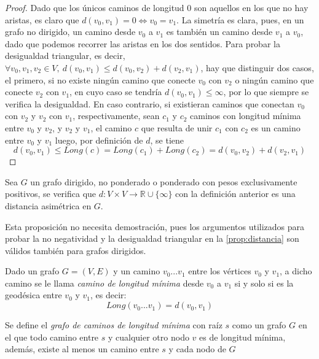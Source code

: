 \begin{proof}
	Dado que los únicos caminos de longitud $0$ son aquellos en los que no hay aristas, es claro que $d(v_0, v_1) = 0 \Leftrightarrow v_0 = v_1$. La simetría es clara, pues, en un grafo no dirigido, un camino desde $v_0$ a $v_1$ es también un camino desde $v_1$ a $v_0$, dado que podemos recorrer las aristas en los dos sentidos. Para probar la desigualdad triangular, es decir, $\forall v_0, v_1, v_2 \in V,\ d(v_0,v_1) \leq d(v_0,v_2) + d(v_2,v_1)$, hay que distinguir dos casos, el primero, si no existe ningún camino que conecte $v_0$ con $v_2$ o ningún camino que conecte $v_2$ con $v_1$, en cuyo caso se tendría $d(v_0,v_1)\leq \infty$, por lo que siempre se verifica la desigualdad. En caso contrario, si existieran caminos que conectan $v_0$ con $v_2$ y $v_2$ con $v_1$, respectivamente, sean $c_1$ y $c_2$ caminos con longitud mínima entre $v_0$ y $v_2$, y $v_2$ y $v_1$, el camino $c$ que resulta de unir $c_1$ con $c_2$ es un camino entre $v_0$ y $v_1$ luego, por definición de $d$, se tiene
	$$d(v_0, v_1) \leq Long(c) = Long(c_1)+Long(c_2)=d(v_0,v_2)+d(v_2,v_1)$$
\end{proof}

\begin{proposicion}
	Sea $G$ un grafo dirigido, no ponderado o ponderado con pesos exclusivamente positivos, se verifica que $d:V\times V \rightarrow \mathbb{R}\cup \{\infty\}$ con la definición anterior es una distancia asimétrica en $G$.
\end{proposicion}

Esta proposición no necesita demostración, pues los argumentos utilizados para probar la no negatividad y la desigualdad triangular en la \autoref{prop:distancia} son válidos también para grafos dirigidos.

\begin{definicion}
	Dado un grafo $G=(V,E)$ y un camino $v_0...v_1$ entre los vértices $v_0$ y $v_1$, a dicho camino se le llama \textit{camino de longitud mínima} desde $v_0$ a $v_1$ si y solo si es la geodésica entre $v_0$ y $v_1$, es decir:
	$$Long(v_0...v_1) = d(v_0, v_1)$$
\end{definicion}

\begin{definicion}
	Se define el \textit{grafo de caminos de longitud mínima} con raíz $s$ como un grafo $G$ en el que todo camino entre $s$ y cualquier otro nodo $v$ es de longitud mínima, además, existe al menos un camino entre $s$ y cada nodo de $G$
\end{definicion}


